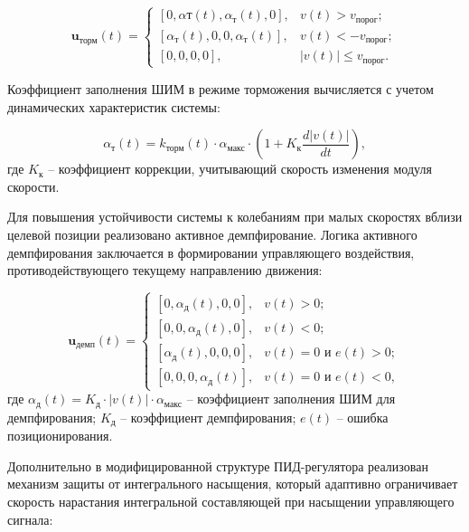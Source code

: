 \begin{equation}\label{eq:braking_control_expanded}
	\mathbf{u}_{\text{торм}}(t) = \begin{cases}
		[0, \alpha{\text{т}}(t), \alpha_{\text{т}}(t), 0],  & v(t) > v_{\text{порог}};      \\
		[\alpha_{\text{т}}(t), 0, 0, \alpha_{\text{т}}(t)], & v(t) < -v_{\text{порог}};     \\
		[0, 0, 0, 0],                                       & |v(t)| \leq v_{\text{порог}}.
	\end{cases}
\end{equation}

Коэффициент заполнения ШИМ в режиме торможения вычисляется с учетом динамических характеристик системы:

\begin{equation}\label{eq:braking_pwm_expanded}
	\alpha_{\text{т}}(t) = k_{\text{торм}}(t) \cdot \alpha_{\text{макс}} \cdot \left(1 + K_{\text{к}}\frac{d|v(t)|}{dt}\right),
\end{equation}
где $K_{\text{к}}$ -- коэффициент коррекции, учитывающий скорость изменения модуля скорости.

Для повышения устойчивости системы к колебаниям при малых скоростях вблизи целевой позиции
реализовано активное демпфирование. Логика активного демпфирования заключается в формировании
управляющего воздействия, противодействующего текущему направлению движения:

\begin{equation}\label{eq:active_damping}
	\mathbf{u}_{\text{демп}}(t) = \begin{cases}
		[0, \alpha_{\text{д}}(t), 0, 0], & v(t) > 0;                     \\
		[0, 0, \alpha_{\text{д}}(t), 0], & v(t) < 0;                     \\
		[\alpha_{\text{д}}(t), 0, 0, 0], & v(t) = 0 \text{ и } e(t) > 0; \\
		[0, 0, 0, \alpha_{\text{д}}(t)], & v(t) = 0 \text{ и } e(t) < 0,
	\end{cases}
\end{equation}
где $\alpha_{\text{д}}(t) = K_{\text{д}} \cdot |v(t)| \cdot \alpha_{\text{макс}}$ -- коэффициент заполнения ШИМ для демпфирования;
$K_{\text{д}}$ -- коэффициент демпфирования;
$e(t)$ -- ошибка позиционирования.

Дополнительно в модифицированной структуре ПИД-регулятора реализован механизм защиты от
интегрального насыщения, который адаптивно ограничивает скорость нарастания
интегральной составляющей при насыщении управляющего сигнала:

